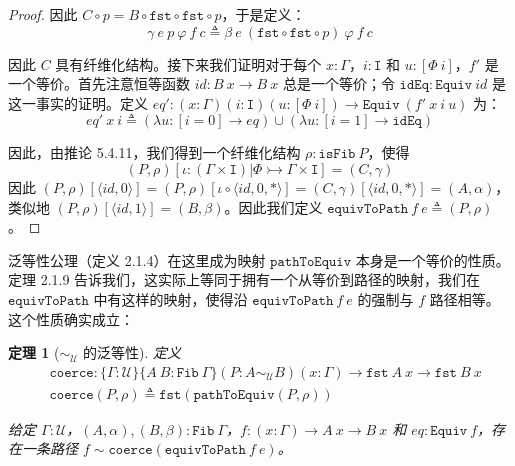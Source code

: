 \documentclass{ctexrep}
\theoremstyle{plain}
\newtheorem{theorem}{定理}[section]
\theoremstyle{definition}
\theoremstyle{remark}
\newcommand\ttI{\mathtt{I}}
\begin{document}
\begin{proof}
因此 $C \circ p = B \circ \mathtt{fst} \circ \mathtt{fst} \circ p$，于是定义：
\[
\gamma\ e\ p\ \varphi\ f\ c \triangleq \beta\ e\ (\mathtt{fst} \circ \mathtt{fst} \circ p)\ \varphi\ f\ c
\]

因此 $C$ 具有纤维化结构。接下来我们证明对于每个 $x : \Gamma$，$i : \ttI$ 和 $u : [\Phi\ i]$，$f'$ 是一个等价。首先注意恒等函数 $ id  : B\ x \to B\ x$ 总是一个等价；令 $\mathtt{idEq} : \mathtt{Equiv}\  id $ 是这一事实的证明。定义 $eq' : (x : \Gamma)(i : \ttI)(u : [\Phi\ i]) \to \mathtt{Equiv}\ (f'\ x\ i\ u)$ 为：
\[
eq'\ x\ i \triangleq (\lambda u : [i = 0] \to eq) \cup (\lambda u : [i = 1] \to \mathtt{idEq})
\]

因此，由推论 5.4.11，我们得到一个纤维化结构 $\rho : \mathtt{isFib}\ P$，使得
\[
(P, \rho)[\iota : (\Gamma \times \ttI)|\Phi \rightarrowtail \Gamma \times \ttI] = (C, \gamma)
\]
因此 $(P, \rho)[\langle  id , 0\rangle] = (P, \rho)[\iota \circ \langle  id , 0, *\rangle] = (C, \gamma)[\langle  id , 0, *\rangle] = (A, \alpha)$，类似地 $(P, \rho)[\langle  id , 1\rangle] = (B, \beta)$。因此我们定义 $\mathtt{equivToPath}\ f\ e \triangleq (P, \rho)$。
\end{proof}

泛等性公理（定义 2.1.4）在这里成为映射 $\mathtt{pathToEquiv}$ 本身是一个等价的性质。定理 2.1.9 告诉我们，这实际上等同于拥有一个从等价到路径的映射，我们在 $\mathtt{equivToPath}$ 中有这样的映射，使得沿 $\mathtt{equivToPath}\ f\ e$ 的强制与 $f$ 路径相等。这个性质确实成立：

\begin{theorem}[$\sim_{\mathcal{U}}$ 的泛等性]
定义
\begin{align*}
&\mathtt{coerce} : \{\Gamma : \mathcal{U}\}\{A\ B : \mathtt{Fib}\ \Gamma\}(P : A \sim_{\mathcal{U}} B)(x : \Gamma) \to \mathtt{fst}\ A\ x \to \mathtt{fst}\ B\ x\\
&\mathtt{coerce}(P, \rho) \triangleq \mathtt{fst}(\mathtt{pathToEquiv}(P, \rho))
\end{align*}

给定 $\Gamma : \mathcal{U}$，$(A, \alpha), (B, \beta) : \mathtt{Fib}\ \Gamma$，$f : (x : \Gamma) \to A\ x \to B\ x$ 和 $eq : \mathtt{Equiv}\ f$，存在一条路径 $f \sim \mathtt{coerce}(\mathtt{equivToPath}\ f\ e)$。
\end{theorem}
\end{document}
